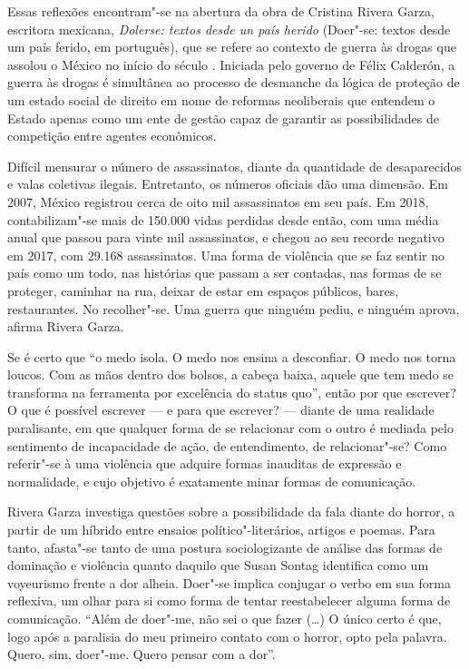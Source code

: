 Essas reflexões encontram"-se na abertura da obra de Cristina Rivera
Garza, escritora mexicana, \emph{Dolerse: textos desde un país herido}
(Doer"-se: textos desde um país ferido, em português), que se refere ao
contexto de guerra às drogas que assolou o México no início do século
. Iniciada pelo governo de Félix Calderón, a guerra às drogas é
simultânea ao processo de desmanche da lógica de proteção de um estado
social de direito em nome de reformas neoliberais que entendem o Estado
apenas como um ente de gestão capaz de garantir as possibilidades de
competição entre agentes econômicos.

Difícil mensurar o número de assassinatos, diante da quantidade de
desaparecidos e valas coletivas ilegais. Entretanto, os números oficiais
dão uma dimensão. Em 2007, México registrou cerca de oito mil
assassinatos em seu país. Em 2018, contabilizam"-se mais de 150.000 vidas
perdidas desde então, com uma média anual que passou para vinte mil
assassinatos, e chegou ao seu recorde negativo em 2017, com 29.168
assassinatos. Uma forma de violência que se faz sentir no país como um
todo, nas histórias que passam a ser contadas, nas formas de se
proteger, caminhar na rua, deixar de estar em espaços públicos, bares,
restaurantes. No recolher"-se. Uma guerra que ninguém pediu, e ninguém
aprova, afirma Rivera Garza.

Se é certo que ``o medo isola. O medo nos ensina a desconfiar. O medo
nos torna loucos. Com as mãos dentro dos bolsos, a cabeça baixa, aquele
que tem medo se transforma na ferramenta por excelência do status quo'',
então por que escrever? O que é possível escrever --- e para que
escrever? --- diante de uma realidade paralisante, em que qualquer forma
de se relacionar com o outro é mediada pelo sentimento de incapacidade
de ação, de entendimento, de relacionar"-se? Como referir"-se à uma
violência que adquire formas inauditas de expressão e normalidade, e
cujo objetivo é exatamente minar formas de comunicação.

Rivera Garza investiga questões sobre a possibilidade da fala diante do
horror, a partir de um híbrido entre ensaios político"-literários,
artigos e poemas. Para tanto, afasta"-se tanto de uma postura
sociologizante de análise das formas de dominação e violência quanto
daquilo que Susan Sontag identifica como um voyeurismo frente a dor
alheia. Doer"-se implica conjugar o verbo em sua forma reflexiva, um
olhar para si como forma de tentar reestabelecer alguma forma de
comunicação. ``Além de doer"-me, não sei o que fazer (\ldots{}) O único
certo é que, logo após a paralisia do meu primeiro contato com o horror,
opto pela palavra. Quero, sim, doer"-me. Quero pensar com a dor''.

